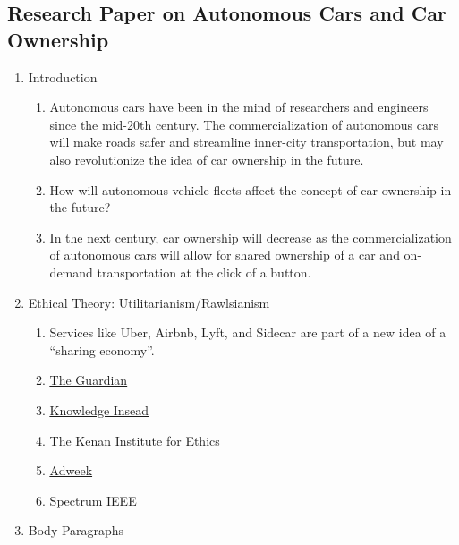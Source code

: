 \documentclass{article}
\begin{document}
\subsection*{Research Paper on Autonomous Cars and Car Ownership}
\begin{enumerate}
  \item Introduction
  \begin{enumerate}
    \item Autonomous cars have been in the mind of researchers and engineers
      since the mid-20th century. The commercialization of autonomous cars will
      make roads safer and streamline inner-city transportation, but may also
      revolutionize the idea of car ownership in the future.
    \item How will autonomous vehicle fleets affect the concept of car ownership
      in the future?
    \item In the next century, car ownership will decrease as the
      commercialization of autonomous cars will allow for shared ownership of
      a car and on-demand transportation at the click of a button.
  \end{enumerate}
  \item Ethical Theory: Utilitarianism/Rawlsianism
  \begin{enumerate}
    \item Services like Uber, Airbnb, Lyft, and Sidecar are part of a new idea
      of a ``sharing economy''.
    \item \href{https://www.theguardian.com/technology/2016/oct/17/sharing-economy-capitalism-uber-airbnb-ownership}{\underline{The Guardian}}
    \item \href{http://knowledge.insead.edu/responsibility/whos-responsible-the-ethics-of-the-sharing-economy-5034}{\underline{Knowledge Insead}}
    \item \href{https://kenan.ethics.duke.edu/wp-content/uploads/2012/08/Sharing-EconomyTN2015.pdf}{\underline{The Kenan Institute for Ethics}}
    \item \href{http://www.adweek.com/digital/sharing-economy-steeped-ethical-controversy/}{\underline{Adweek}}
    \item \href{http://spectrum.ieee.org/cars-that-think/transportation/self-driving/people-want-driverless-cars-with-utilitarian-ethics-unless-theyre-a-passenger}{\underline{Spectrum IEEE}}
  \end{enumerate}
  \item Body Paragraphs
  \begin{enumerate}

\end{enumerate}
\end{enumerate}
\end{document}
